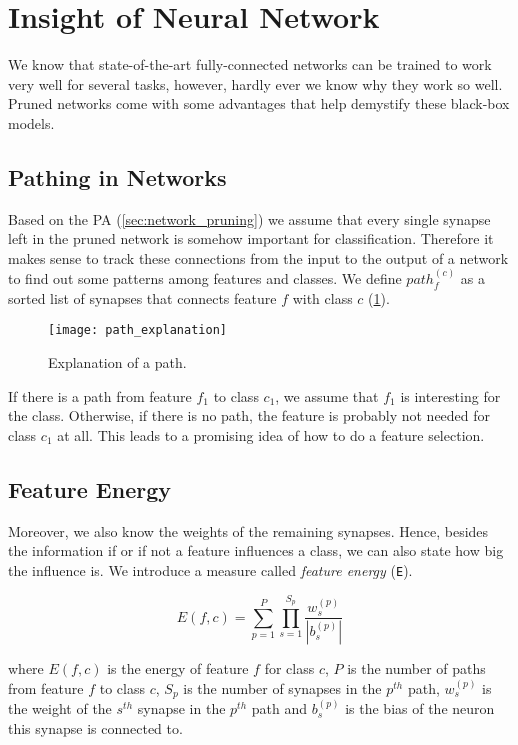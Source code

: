 \section{Insight of Neural Network} \label{sec:insight_of_neural_network}
We know that state-of-the-art fully-connected networks can be trained to work very well for several tasks, however, hardly ever we know why they work so well. Pruned networks come with some advantages that help demystify these black-box models.

\subsection*{Pathing in Networks}
Based on the PA (\cref{sec:network_pruning}) we assume that every single synapse left in the pruned network is somehow important for classification. Therefore it makes sense to track these connections from the input to the output of a network to find out some patterns among features and classes. We define $ path_f^{(c)} $ as a sorted list of synapses that connects feature $ f $ with class $ c $ (\cref{fig:methods:path_explanation}).

\begin{figure}[H]
  \centering
  \texttt{[image: path\_explanation]}
  \caption{Explanation of a path.}
  \label{fig:methods:path_explanation}
\end{figure}

If there is a path from feature $ f_1 $ to class $ c_1 $, we assume that $ f_1 $ is interesting for the class. Otherwise, if there is no path, the feature is probably not needed for class $ c_1 $ at all. This leads to a promising idea of how to do a feature selection.

\subsection*{Feature Energy}
Moreover, we also know the weights of the remaining synapses. Hence, besides the information if or if not a feature influences a class, we can also state how big the influence is. We introduce a measure called \textit{feature energy} (\texttt{E}).

\begin{equation} \label{eq:feature_energy}
E(f,c) = \displaystyle{\sum_{p=1}^{P} \displaystyle{\prod_{s=1}^{S_p} \frac{w_s^{(p)}}{|b_s^{(p)}|}}}
\end{equation}

where $ E(f,c) $ is the energy of feature $ f $ for class $ c $, $ P $ is the number of paths from feature $ f $ to class $ c $, $ S_p $ is the number of synapses in the $ p^{th} $ path, $ w_s^{(p)} $ is the weight of the $ s^{th} $ synapse in the $ p^{th} $ path and $ b_s^{(p)} $ is the bias of the neuron this synapse is connected to.

